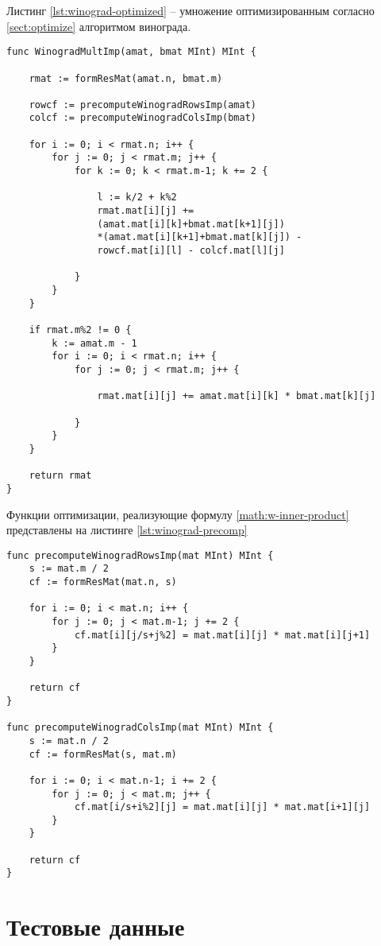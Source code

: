 Листинг \ref{lst:winograd-optimized} -- умножение оптимизированным согласно \ref{sect:optimize} алгоритмом винограда.
\begin{lstlisting}[label=lst:winograd-optimized,caption=Оптимизированный алгоритм умнложения Виноградом]
func WinogradMultImp(amat, bmat MInt) MInt {
	
	rmat := formResMat(amat.n, bmat.m)
	
	rowcf := precomputeWinogradRowsImp(amat)
	colcf := precomputeWinogradColsImp(bmat)
	
	for i := 0; i < rmat.n; i++ {
		for j := 0; j < rmat.m; j++ {
			for k := 0; k < rmat.m-1; k += 2 {
				
				l := k/2 + k%2
				rmat.mat[i][j] += 
				(amat.mat[i][k]+bmat.mat[k+1][j])
				*(amat.mat[i][k+1]+bmat.mat[k][j]) -
				rowcf.mat[i][l] - colcf.mat[l][j]
				
			}
		}
	}
	
	if rmat.m%2 != 0 {
		k := amat.m - 1
		for i := 0; i < rmat.n; i++ {
			for j := 0; j < rmat.m; j++ {
				
				rmat.mat[i][j] += amat.mat[i][k] * bmat.mat[k][j]
				
			}
		}
	}
	
	return rmat
}
\end{lstlisting}
Функции оптимизации, реализующие формулу \ref{math:w-inner-product} представлены на листинге \ref{lst:winograd-precomp}
\begin{lstlisting}[label=lst:winograd-precomp,caption=Функции препроцессирования для алгоримов Винограда]
func precomputeWinogradRowsImp(mat MInt) MInt {
	s := mat.m / 2
	cf := formResMat(mat.n, s)
	
	for i := 0; i < mat.n; i++ {
		for j := 0; j < mat.m-1; j += 2 {
			cf.mat[i][j/s+j%2] = mat.mat[i][j] * mat.mat[i][j+1]
		}
	}
	
	return cf
}

func precomputeWinogradColsImp(mat MInt) MInt {
	s := mat.n / 2
	cf := formResMat(s, mat.m)
	
	for i := 0; i < mat.n-1; i += 2 {
		for j := 0; j < mat.m; j++ {
			cf.mat[i/s+i%2][j] = mat.mat[i][j] * mat.mat[i+1][j]
		}
	}
	
	return cf
}
\end{lstlisting}


\captionsetup{singlelinecheck = false, justification=raggedleft}
\section{Тестовые данные}


